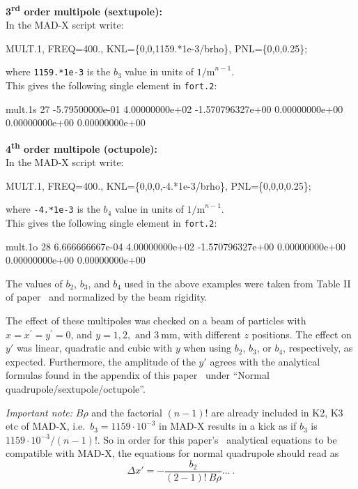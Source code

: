 \noindent\textbf{3\textsuperscript{rd} order multipole (sextupole):}\\
\noindent In the MAD-X script write:
\begin{ctverbatim}
MULT.1, FREQ=400., KNL=\{0,0,1159.*1e-3/brho\}, PNL=\{0,0,0.25\};
\end{ctverbatim}
where \texttt{1159.*1e-3} is the $b_3$ value in units of $\mathrm{1/m}^{n-1}$.\\
This gives the following single element in \texttt{fort.2}:
\begin{ctverbatim}
mult.1s  27 -5.79500000e-01  4.00000000e+02  -1.570796327e+00  0.00000000e+00  0.00000000e+00  0.00000000e+00
\end{ctverbatim}

\noindent\textbf{4\textsuperscript{th} order multipole (octupole):}\\
\noindent In  the MAD-X script write:
\begin{ctverbatim}
MULT.1, FREQ=400., KNL=\{0,0,0,-4.*1e-3/brho\}, PNL=\{0,0,0,0.25\};
\end{ctverbatim}
where \texttt{-4.*1e-3} is the $b_4$ value in units of $\mathrm{1/m}^{n-1}$.\\
This gives the following single element in \texttt{fort.2}:
\begin{ctverbatim}
mult.1o  28  6.666666667e-04  4.00000000e+02  -1.570796327e+00  0.00000000e+00  0.00000000e+00  0.00000000e+00
\end{ctverbatim}

\bigskip
\noindent The values of $b_2$, $b_3$, and $b_4$ used in the above examples were taken from Table II of paper~\cite{RFmultsPaper} and normalized by the beam rigidity.

The effect of these multipoles was checked on a beam of particles with $x=x^{\prime}=y^{\prime}=0$, and $y= 1, 2, \text{ and } 3~\mathrm{mm}$, with different $z$ positions.
The effect on $y'$ was linear, quadratic and cubic with $y$ when using $b_2$, $b_3$, or $b_4$, respectively, as expected.
Furthermore, the amplitude of the $y'$ agrees with the analytical formulas found in the appendix of this paper~\cite{RFmultsPaper} under ``Normal quadrupole/sextupole/octupole''.

\textit{Important note:} $B\rho$ and the factorial $(n-1)!$ are already included in K2, K3 etc of MAD-X, i.e.\ $b_3=1159\cdot10^{-3}$ in MAD-X results in a kick as if $b_3$ is $1159\cdot10^{-3}/(n-1)!$.
So in order for this paper's~\cite{RFmultsPaper} analytical equations to be compatible with MAD-X, the equations for normal quadrupole should read as
\begin{equation*}
    \Delta x'=-\frac{b_2}{(2-1)! ~ B\rho} \ldots~.
\end{equation*}


